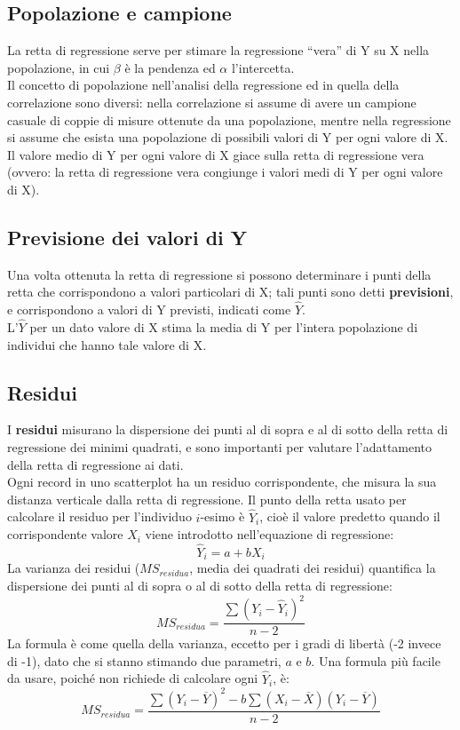 \documentclass[10pt, draft]{book}
\begin{document}
\subsection{Popolazione e campione}

La retta di regressione serve per stimare la regressione ``vera'' di Y su X nella popolazione, in cui $\beta$ è la pendenza ed $\alpha$ l'intercetta.\\
Il concetto di popolazione nell'analisi della regressione ed in quella della correlazione sono diversi: nella correlazione si assume di avere un campione casuale di coppie di misure ottenute da una popolazione, mentre nella regressione si assume che esista una popolazione di possibili valori di Y per ogni valore di X. Il valore medio di Y per ogni valore di X giace sulla retta di regressione vera (ovvero: la retta di regressione vera congiunge i valori medi di Y per ogni valore di X).

\subsection{Previsione dei valori di Y}

Una volta ottenuta la retta di regressione si possono determinare i punti della retta che corrispondono a valori particolari di X; tali punti sono detti \textbf{previsioni}, e corrispondono a valori di Y previsti, indicati come $\hat{Y}$.\\
L'$\hat{Y}$ per un dato valore di X stima la media di Y per l'intera popolazione di individui che hanno tale valore di X.

\subsection{Residui}

I \textbf{residui} misurano la dispersione  dei punti al di sopra e al di sotto della retta di regressione dei minimi quadrati, e sono importanti per valutare l'adattamento della retta di regressione ai dati.\\
Ogni record in uno scatterplot ha un residuo corrispondente, che misura la sua distanza verticale dalla retta di regressione. Il punto della retta usato per calcolare il residuo per l'individuo $i$-esimo è $\hat{Y}_i$, cioè il valore predetto quando il corrispondente valore $X_i$ viene introdotto nell'equazione di regressione:
\begin{equation}
    \hat{Y}_i = a+bX_i
\end{equation}
La varianza dei residui ($MS_{residua}$, media dei quadrati dei residui) quantifica la dispersione dei punti al di sopra o al di sotto della retta di regressione:
\begin{equation}
    MS_{residua} = \frac{\sum{(Y_i-\hat{Y}_i)^2}}{n-2}
\end{equation}
La formula è come quella della varianza, eccetto per i gradi di libertà (-2 invece di -1), dato che si stanno stimando due parametri, $a$ e $b$.
Una formula più facile da usare, poiché non richiede di calcolare ogni $\hat{Y}_i$, è:
\begin{equation}
    MS_{residua} = \frac{\sum{(Y_i-\overline{Y})^2}-b\sum{(X_i-\overline{X})(Y_i-\overline{Y})}}{n-2}
\end{equation}
\end{document}
